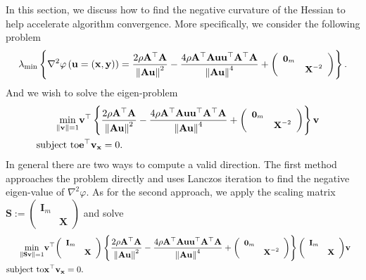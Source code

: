 \documentclass{article}
\newcommand{\assign}{:=}
\newcommand{\x}{\mathbf{x}}
\newcommand{\A}{\mathbf{A}}
\newcommand{\0}{\textbf{0}}
\newcommand{\e}{\mathbf{e}}
\newcommand{\n}{\nabla}
\newcommand{\X}{\mathbf{X}}
\newcommand{\I}{\mathbf{I}}
\newcommand{\y}{\mathbf{y}}
\newcommand{\tmu}{\mathbf{u}}
\newcommand{\bs}{\mathbf{S}}
\newcommand{\tmv}{\mathbf{v}}
\begin{document}
In this section, we discuss how to find the negative curvature of the Hessian
to help accelerate algorithm convergence. More specifically, we consider the
following problem
\[ \lambda_{\min} \left\{ \nabla^2 \varphi \left( \tmu = \left( \x, \y \right)
   \right) = \frac{2 \rho \A^{\top} \A}{\left\| \A \tmu \right\|^2} - \frac{4
   \rho \A^{\top} \A \tmu \tmu^{\top} \A^{\top} \A}{\left\| \A \tmu
   \right\|^4} + \small{\left(\begin{array}{cc}
     \0_m & \\
     & \X^{- 2}
   \end{array}\right)} \right\} . \]
And we wish to solve the eigen-problem
\begin{eqnarray*}
  \min_{\left\| \tmv \right\| = 1} & \tmv^{\top} \left\{ \frac{2 \rho
  \A^{\top} \A}{\left\| \A \tmu \right\|^2} - \frac{4 \rho \A^{\top} \A \tmu
  \tmu^{\top} \A^{\top} \A}{\left\| \A \tmu \right\|^4} +
  \small{\left(\begin{array}{cc}
    \0_m & \\
    & \X^{- 2}
  \end{array}\right)} \right\} \tmv & \\
  \text{subject to} & \e^{\top} \tmv_{\x} = 0. & 
\end{eqnarray*}
In general there are two ways to compute a valid direction. The first method
approaches the problem directly and uses Lanczos iteration to find the
negative eigen-value of $\n^2 \varphi$. As for the second approach, we apply
the scaling matrix $\bs \assign \left(\begin{array}{cc}
  \I_m & \\
  & \X
\end{array}\right)$ and solve
\begin{eqnarray*}
  \min_{\left\| \bs \tmv \right\| = 1} & \tmv^{\top}
  \small{\left(\begin{array}{cc}
    \I_m & \\
    & \X
  \end{array}\right)} \left\{ \frac{2 \rho \A^{\top} \A}{\left\| \A \tmu
  \right\|^2} - \frac{4 \rho \A^{\top} \A \tmu \tmu^{\top} \A^{\top}
  \A}{\left\| \A \tmu \right\|^4} + \small{\left(\begin{array}{cc}
    \0_m & \\
    & \X^{- 2}
  \end{array}\right)} \right\} \small{\left(\begin{array}{cc}
    \I_m & \\
    & \X
  \end{array}\right)} \tmv & \\
  \text{subject to} & \x^{\top} \tmv_{\x} = 0. & 
\end{eqnarray*}
\end{document}
